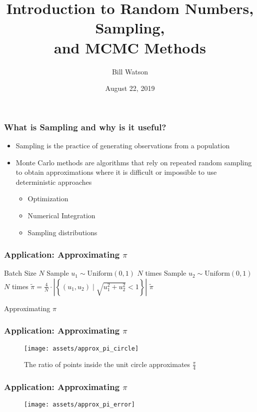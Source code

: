 \documentclass{beamer}
\title{Introduction to Random Numbers, Sampling,\\and MCMC Methods}
\author{Bill Watson}
\institute{S\&P Global}
\date{August 22, 2019}
\begin{document}
\begin{frame}
\titlepage
\end{frame}


\begin{frame}
\frametitle{What is Sampling and why is it useful?}
\begin{itemize}
  \item Sampling is the practice of generating observations from a population
  \item Monte Carlo methods are algorithms that rely on repeated random sampling
    to obtain approximations where it is difficult or impossible to use deterministic approaches
    \begin{itemize}
      \item Optimization
      \item Numerical Integration
      \item Sampling distributions
    \end{itemize}
\end{itemize}
\end{frame}


\begin{frame}
\frametitle{Application: Approximating $\pi$}
\begin{algorithm}[H]
\begin{algorithmic}[1]
  \REQUIRE Batch Size $N$
  \STATE Sample $u_1 \sim \text{Uniform}(0, 1)$ $N$ times
  \STATE Sample $u_2 \sim \text{Uniform}(0, 1)$ $N$ times
  \STATE $\tilde{\pi} = \frac{4}{N} \cdot \left\vert \left\{ (u_1, u_2) \; \Big \vert \; \sqrt{u_1^2 + u_2^2} < 1 \right\} \right\vert$
  \ENSURE $\tilde{\pi}$
\end{algorithmic}
\caption{Approximating $\pi$}
\end{algorithm}
\end{frame}


\begin{frame}
  \frametitle{Application: Approximating $\pi$}
  \begin{figure}
    \centering
    \texttt{[image: assets/approx\_pi\_circle]}
    \caption{The ratio of points inside the unit circle approximates $\frac{\pi}{4}$}
  \end{figure}
\end{frame}


\begin{frame}
  \frametitle{Application: Approximating $\pi$}
  \begin{figure}
    \centering
    \texttt{[image: assets/approx\_pi\_error]}
  \end{figure}
\end{frame}
\end{document}
